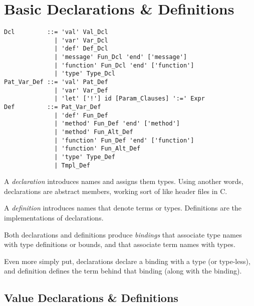 
\chapter{Basic Declarations \& Definitions}

\syntax\begin{lstlisting}
Dcl         ::= 'val' Val_Dcl
              | 'var' Var_Dcl
              | 'def' Def_Dcl
              | 'message' Fun_Dcl 'end' ['message']
              | 'function' Fun_Dcl 'end' ['function']
              | 'type' Type_Dcl
Pat_Var_Def ::= 'val' Pat_Def
              | 'var' Var_Def
              | 'let' ['!'] id [Param_Clauses] ':=' Expr
Def         ::= Pat_Var_Def
              | 'def' Fun_Def
              | 'method' Fun_Def 'end' ['method']
              | 'method' Fun_Alt_Def
              | 'function' Fun_Def 'end' ['function']
              | 'function' Fun_Alt_Def
              | 'type' Type_Def
              | Tmpl_Def
\end{lstlisting}

A {\em declaration} introduces names and assigns them types. Using another words, declarations are abstract members, working sort of like header files in C. 

A {\em definition} introduces names that denote terms or types. Definitions are the implementations of declarations. 

Both declarations and definitions produce {\em bindings} that associate type names with type definitions or bounds, and that associate term names with types. 

Even more simply put, declarations declare a binding with a type (or type-less), and definition defines the term behind that binding (along with the binding). 







\section{Value Declarations \& Definitions}
\label{sec:value-dcl-def}

